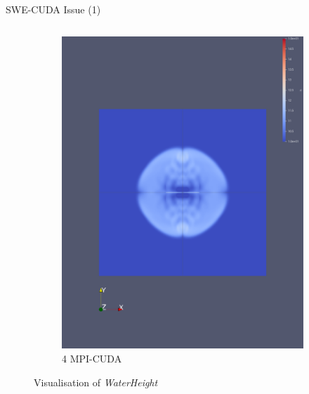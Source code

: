 \documentclass[
  english,            %
  aspectratio=169,    %
  11pt
]{tumbeamer}
\begin{document}
\begin{frame}{SWE-CUDA Issue (1)}
\begin{columns}
\begin{column}{0.45\textwidth}
\begin{figure}[htpb]
\begin{subfigure}{.49\textwidth}
			\includegraphics[width=\textwidth,keepaspectratio=true]{figs/1_validation_cuda_original_4mpi.png}
			\caption{4 MPI-CUDA}
			\label{fig:1mpi-cuda-original}
		\end{subfigure}
		\caption{Visualisation of \textit{WaterHeight}}
	\end{figure}
\end{column}

\end{columns}
\end{frame}
\end{document}
